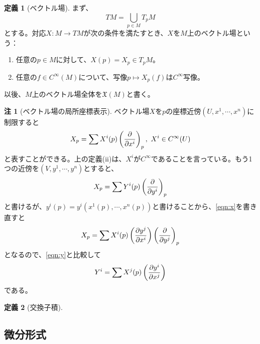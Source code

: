 \documentclass[unicode,a4paper,11pt]{ltjsarticle}
\theoremstyle{definition}
\newtheorem{dfn}{定義}[section]
\newtheorem{rmk}{注}[section]
\begin{document}
\begin{dfn}[ベクトル場]
  まず、
  \begin{equation}
    TM=\bigcup_{p\in M}T_{p}M
  \end{equation}
  とする。対応$X:M\rightarrow TM$が次の条件を満たすとき、$X$を$M$上のベクトル場という：
  \begin{enumerate}
    \item
          任意の$p\in M$に対して、$X(p)=X_{p}\in T_{p}M$。
    \item 
    任意の$f\in C^{\infty}(M)$について、写像$p\mapsto X_{p}(f)$は$C^{\infty}$写像。
  \end{enumerate}
  以後、$M$上のベクトル場全体を$\mathfrak{X}(M)$と書く。
\end{dfn}

\begin{rmk}[ベクトル場の局所座標表示]
  ベクトル場$X$を$p$の座標近傍$(U,x^{1},\cdots,x^{n})$に制限すると
  \begin{equation}
    X_{p}
    =
    \sum X^{i}(p)\left( \pdv{}{x^{i}} \right)_{p}
    ,\ 
    X^{i}\in C^{\infty}(U)
    \label{eqn:x}
  \end{equation}
  と表すことができる。上の定義(ii)は、$X^{i}$が$C^{\infty}$であることを言っている。もう1つの近傍を$(V,y^{1},\cdots,y^{n})$とすると、
  \begin{equation}
    X_{p}
    =
    \sum Y^{i}(p)\left( \pdv{}{y^{i}} \right)_{p}
    \label{eqn:y}
  \end{equation}
  と書けるが、$y^{i}(p)=y^{i}(x^{1}(p),\cdots,x^{n}(p))$と書けることから、\eqref{eqn:x}を書き直すと
  \begin{equation}
    X_{p}
    =
    \sum X^{i}(p)\left( \pdv{y^{j}}{x^{i}} \right)\left( \pdv{}{y^{j}} \right)_{p}
  \end{equation}
  となるので、\eqref{eqn:y}と比較して
  \begin{equation}
    Y^{i}
    =
    \sum X^{j}(p)\left( \pdv{y^{i}}{x^{j}} \right)
  \end{equation}
  である。
\end{rmk}

\begin{dfn}[交換子積]
  
\end{dfn}



\clearpage

\subsection{微分形式}
\end{document}
